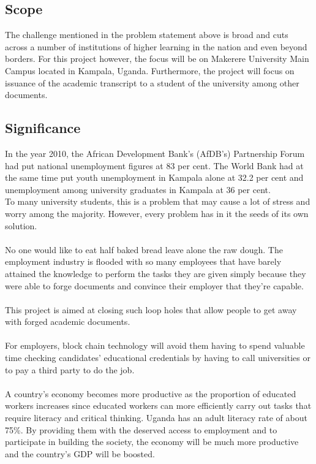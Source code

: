 \subsection{Scope}

The challenge mentioned in the problem statement above is broad and cuts across a number of institutions of higher learning in the nation and even beyond borders. For this project however, the focus will be on Makerere University Main Campus located in Kampala, Uganda. Furthermore, the project will focus on issuance of the academic transcript to a student of the university among other documents.

\subsection{Significance}
In the year 2010, the African Development Bank’s (AfDB’s) Partnership Forum had put national unemployment figures at 83 per cent. The World Bank had at the same time put youth unemployment in Kampala alone at 32.2 per cent and unemployment among university graduates in Kampala at 36 per cent.\cite{art4}\\
To many university students, this is a problem that may cause a lot of stress and worry among the majority. However, every problem has in it the seeds of its own solution.\\\\
No one would like to eat half baked bread leave alone the raw dough. The employment industry is flooded with so many employees that have barely attained the knowledge to perform the tasks they are given simply because they were able to forge documents and convince their employer that they’re capable. \\\\
This project is aimed at closing such loop holes that allow people to get away with forged academic documents.\\\\
For employers, block chain technology will avoid them having to spend valuable time checking candidates' educational credentials by having to call universities or to pay a third party to do the job. \\\\
A country's economy becomes more productive as the proportion  of educated workers increases since educated workers can more efficiently carry out tasks that require literacy and critical thinking.
Uganda has an adult literacy rate of about 75\%\cite{art5}. By providing them with the deserved access to employment and to participate in building the society, the economy will be much more productive and the country's GDP will be
boosted.